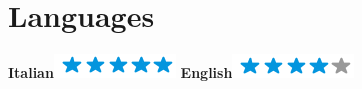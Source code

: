 \documentclass[]{friggeri-cv}
\begin{document}
\begin{aside}
~
~
~
    ~
    ~
  \section{Languages}
    \textbf{Italian}\includegraphics[scale=0.40]{img/5stars.png}
    \textbf{English}\includegraphics[scale=0.40]{img/4stars.png}
    ~
\end{aside}

\end{document}
